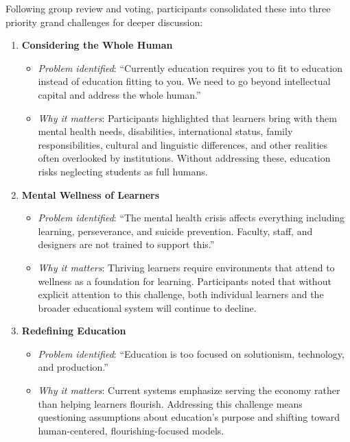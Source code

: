 \documentclass[
  letterpaper,
  DIV=11,
  numbers=noendperiod]{scrartcl}
\begin{document}
Following group review and voting, participants consolidated these into
three priority grand challenges for deeper discussion:

\begin{enumerate}
\def\labelenumi{\arabic{enumi}.}
\item
  \textbf{Considering the Whole Human}

  \begin{itemize}
  \item
    \emph{Problem identified}: ``Currently education requires you to fit
    to education instead of education fitting to you. We need to go
    beyond intellectual capital and address the whole human.''
  \item
    \emph{Why it matters}: Participants highlighted that learners bring
    with them mental health needs, disabilities, international status,
    family responsibilities, cultural and linguistic differences, and
    other realities often overlooked by institutions. Without addressing
    these, education risks neglecting students as full humans.
  \end{itemize}
\item
  \textbf{Mental Wellness of Learners}

  \begin{itemize}
  \item
    \emph{Problem identified}: ``The mental health crisis affects
    everything including learning, perseverance, and suicide prevention.
    Faculty, staff, and designers are not trained to support this.''
  \item
    \emph{Why it matters}: Thriving learners require environments that
    attend to wellness as a foundation for learning. Participants noted
    that without explicit attention to this challenge, both individual
    learners and the broader educational system will continue to
    decline.
  \end{itemize}
\item
  \textbf{Redefining Education}

  \begin{itemize}
  \item
    \emph{Problem identified}: ``Education is too focused on
    solutionism, technology, and production.''
  \item
    \emph{Why it matters}: Current systems emphasize serving the economy
    rather than helping learners flourish. Addressing this challenge
    means questioning assumptions about education's purpose and shifting
    toward human-centered, flourishing-focused models.
  \end{itemize}
\end{enumerate}
\end{document}
